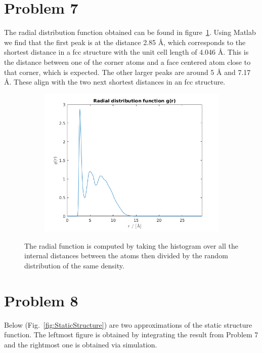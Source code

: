 \section*{Problem 7}

The radial distribution function obtained can be found in figure~\ref{fig:radial}. Using Matlab we find that the first peak is at the distance 2.85 \r{A}, which corresponds to the shortest distance in a fcc structure with the unit cell length of 4.046 \r{A}. This is the distance between one of the corner atoms and a face centered atom close to that corner, which is expected. The other larger peaks are around 5 \r{A} and 7.17 \r{A}. These align with the two next shortest distances in an fcc structure.

\begin{figure}[H]
\centering
\captionsetup[subfigure]{justification=centering}
\begin{subfigure}[b]{0.40\textwidth}
	\centering
	\includegraphics[width=\textwidth]{graphics/task7/radial.png}
\end{subfigure}
\caption{The radial function is computed by taking the histogram over all the internal distances between the atoms then divided by the random distribution of the same density.}
\label{fig:radial}
\end{figure}

\section*{Problem 8}

Below (Fig.~\ref{fig:StaticStructure}) are two approximations of the static structure function. The leftmost figure is obtained by integrating the result from Problem 7 and the rightmost one is obtained via simulation. 

